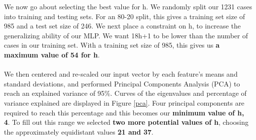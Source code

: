\documentclass{homework}
\begin{document}
We now go about selecting the best value for h. We randomly split our 1231 cases into training and testing sets. For an 80-20 split, this gives a training set size of 985 and a test set size of 246. We next place a constraint on h, to increase the generalizing ability of our MLP. We want 18h+1 to be lower than the number of cases in our training set. With a training set size of 985, this gives us \textbf{a maximum value of 54 for h}.
\\\\
We then centered and re-scaled our input vector by each feature's means and standard deviations, and performed Principal Components Analysis (PCA) to reach an explained variance of 95\%. Curves of the eigenvalues and percentage of variance explained are displayed in Figure \ref{pca}. Four principal components are required to reach this percentage and this becomes our \textbf{minimum value of h, 4}. To fill out this range we selected \textbf{two more potential values of h}, choosing the approximately equidistant values \textbf{21 and 37}.\\\\
\end{document}
